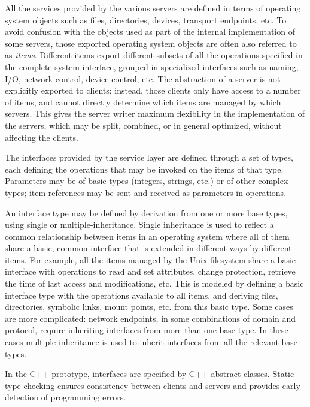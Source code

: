 All the services provided by the various servers are defined in terms
of operating system objects such as files, directories, devices,
transport endpoints, etc. To avoid confusion with the objects used as
part of the internal implementation of some servers, those exported
operating system objects are often also referred to as {\em items}.
Different items export different
subsets of all the operations specified in the complete system
interface, grouped in specialized interfaces such as naming, I/O,
network control, device control, etc. The abstraction of a server is
not explicitly exported to clients; instead, those clients only have
access to a number of items, and cannot directly determine which items
are managed by which servers. This gives the server writer maximum
flexibility in the implementation of the servers, which may be split,
combined, or in general optimized, without affecting the clients.

The interfaces provided by the service layer are defined through a set
of types, each defining the operations that may be invoked on the
items of that type. Parameters may be of basic types (integers,
strings, etc.) or of other complex types; item references may be sent
and received as parameters in operations.

An interface type may be defined by derivation from one or more base
types, using single or multiple-inheritance. Single inheritance is
used to reflect a common relationship between items in an operating
system where all of them share a basic, common interface that is
extended in different ways by different items. For example, all the
items managed by the Unix filesystem share a basic interface with
operations to read and set attributes, change protection, retrieve the
time of last access and modifications, etc. This is modeled by
defining a basic interface type with the operations available to all
items, and deriving files, directories, symbolic links, mount points,
etc. from this basic type. Some cases are more complicated: network
endpoints, in some combinations of domain and protocol, require
inheriting interfaces from more than one base type. In these cases
multiple-inheritance is used to inherit interfaces from all the
relevant base types.

In the C++ prototype, interfaces are specified by C++ abstract
classes. Static type-checking ensures consistency between clients and
servers and provides early detection of programming errors.

